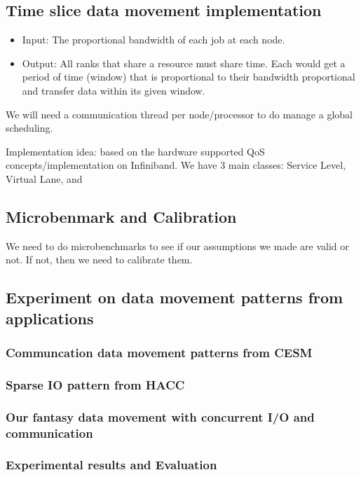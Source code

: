 \documentclass[letter]{article}
\begin{document}
\subsection{Time slice data movement implementation}
\begin{itemize}
\item Input: The proportional bandwidth of each job at each node.
\item Output: All ranks that share a resource must share time. Each would get a period of time (window) that is proportional to their bandwidth proportional and transfer data within its given window.
\end{itemize}

We will need a communication thread per node/processor to do manage a global scheduling.

Implementation idea: based on the hardware supported QoS concepts/implementation on Infiniband. We have 3 main classes: Service Level, Virtual Lane, and 

\subsection{Microbenmark and Calibration}

We need to do microbenchmarks to see if our assumptions we made are valid or not. If not, then we need to calibrate them.

\subsection{Experiment on data movement patterns from applications}
\subsubsection{Communcation data movement patterns from CESM}
\subsubsection{Sparse IO pattern from HACC}
\subsubsection{Our fantasy data movement with concurrent I/O and communication}

\subsubsection{Experimental results and Evaluation}
\end{document}
